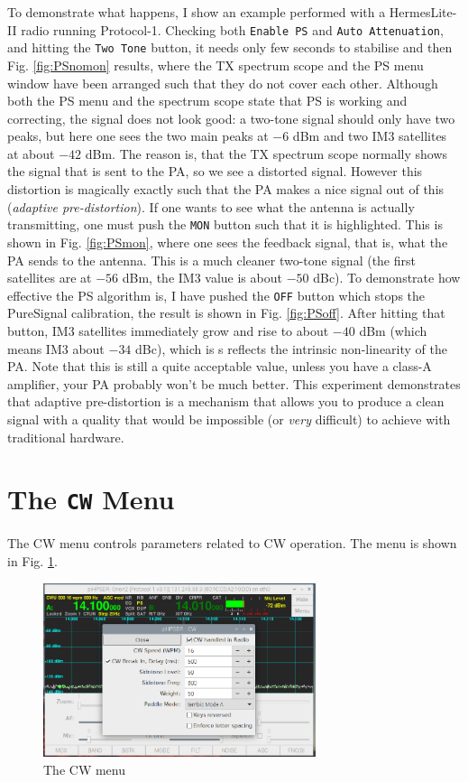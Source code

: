 \documentclass[12pt]{book}
\def\rett#1{\texttt{\color{red}#1}}
\begin{document}
To demonstrate what happens, I show an example performed with a Hermes\-Lite-II
radio running Protocol-1. Checking both \rett{Enable PS} and
\rett{Auto Attenuation}, and hitting the \rett{Two Tone} button, it needs only few
seconds to stabilise and then Fig. \ref{fig:PSnomon} results, where the TX
spectrum scope and the PS menu window have been arranged such that they do
not cover each other. Although both the PS menu and the spectrum scope state
that PS is working and correcting, the signal does not look good: a two-tone
signal should only have two peaks, but here one sees the two main peaks at $-6$ dBm
and two IM3 satellites at about $-42$ dBm.
The reason is, that the TX spectrum scope
normally shows the signal that is sent to the PA, so we see a distorted signal.
However this distortion is magically exactly such that the PA makes a nice signal
out of this (\textit{adaptive pre-distortion}). If one wants to see what the antenna
 is actually transmitting, one must
push the \rett{MON} button such that it is highlighted.
This is shown in Fig. \ref{fig:PSmon}, where one sees the
feedback signal, that is, what the PA sends to the antenna.
This is a much cleaner two-tone signal (the first satellites are at $-56$ dBm,
the IM3 value is about $-50$ dBc). To demonstrate how effective the PS algorithm is,
I have pushed the \rett{OFF} button which stops the PureSignal calibration, the result
is shown in Fig. \ref{fig:PSoff}. After hitting that button, IM3 satellites immediately
grow and rise to about $-40$ dBm (which means IM3
about $-34$ dBc), which is s reflects the intrinsic
non-linearity of the PA.
 Note that this is still a quite acceptable value,
unless you have a class-A amplifier, your PA probably won't be much better.
This experiment demonstrates that adaptive pre-distortion is a mechanism that allows you to produce a clean
signal with a quality that would be impossible (or \textit{very} difficult) to achieve
with traditional hardware.

\section{The \texttt{CW} Menu}
The CW menu controls parameters related to CW operation. The menu
is shown in Fig. \ref{fig:CWMenu}.

\begin{figure}[ht]
\center
\includegraphics[width=8cm]{CWMenu.png}
\caption{The CW menu}
\label{fig:CWMenu}
\end{figure}
\end{document}
